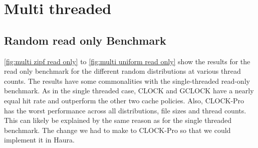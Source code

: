 \documentclass[
	12pt,
	a4paper,
	abstract,
	bibliography=totoc,
	chapterprefix,
	headings=openright,
	numbers=endperiod,
	parskip=half,
	twoside,
]{scrreprt}
\begin{document}
\newpage
\section{Multi threaded}
\subsection{Random read only Benchmark}

\cref{fig:multi zipf read only} to \cref{fig:multi uniform read only}
show the results for the read only benchmark for the different random distributions at various thread counts.
The results have some commonalities with the single-threaded read-only benchmark.
As in the single threaded case, CLOCK and GCLOCK have a nearly equal hit rate and outperform the other two cache policies.
Also, CLOCK-Pro has the worst performance across all distributions, file sizes and thread counts.
This can likely be explained by the same reason as for the single threaded benchmark.
The change we had to make to CLOCK-Pro so that we could implement it in Haura.
\end{document}
